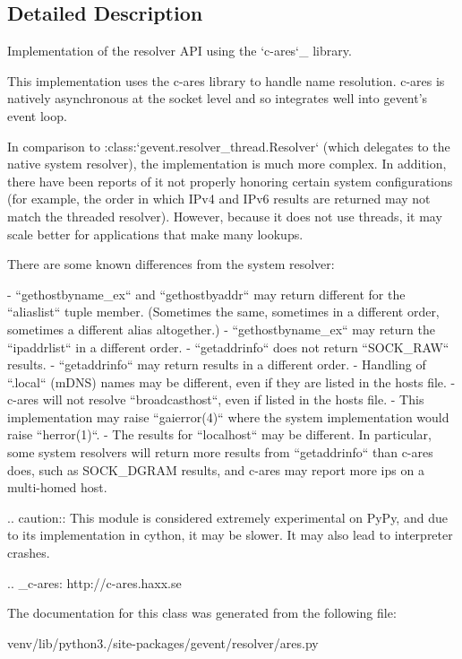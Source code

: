 \subsection{Detailed Description}
\begin{DoxyVerb}Implementation of the resolver API using the `c-ares`_ library.

This implementation uses the c-ares library to handle name
resolution. c-ares is natively asynchronous at the socket level
and so integrates well into gevent's event loop.

In comparison to :class:`gevent.resolver_thread.Resolver` (which
delegates to the native system resolver), the implementation is
much more complex. In addition, there have been reports of it not
properly honoring certain system configurations (for example, the
order in which IPv4 and IPv6 results are returned may not match
the threaded resolver). However, because it does not use threads,
it may scale better for applications that make many lookups.

There are some known differences from the system resolver:

- ``gethostbyname_ex`` and ``gethostbyaddr`` may return different
  for the ``aliaslist`` tuple member. (Sometimes the same,
  sometimes in a different order, sometimes a different alias
  altogether.)
- ``gethostbyname_ex`` may return the ``ipaddrlist`` in a different order.
- ``getaddrinfo`` does not return ``SOCK_RAW`` results.
- ``getaddrinfo`` may return results in a different order.
- Handling of ``.local`` (mDNS) names may be different, even if they are listed in
  the hosts file.
- c-ares will not resolve ``broadcasthost``, even if listed in the hosts file.
- This implementation may raise ``gaierror(4)`` where the system implementation would raise
  ``herror(1)``.
- The results for ``localhost`` may be different. In particular, some system
  resolvers will return more results from ``getaddrinfo`` than c-ares does,
  such as SOCK_DGRAM results, and c-ares may report more ips on a multi-homed
  host.

.. caution:: This module is considered extremely experimental on PyPy, and
   due to its implementation in cython, it may be slower. It may also lead to
   interpreter crashes.

.. _c-ares: http://c-ares.haxx.se
\end{DoxyVerb}
 

The documentation for this class was generated from the following file\+:\begin{DoxyCompactItemize}
\item 
venv/lib/python3./site-\/packages/gevent/resolver/ares.\+py\end{DoxyCompactItemize}
